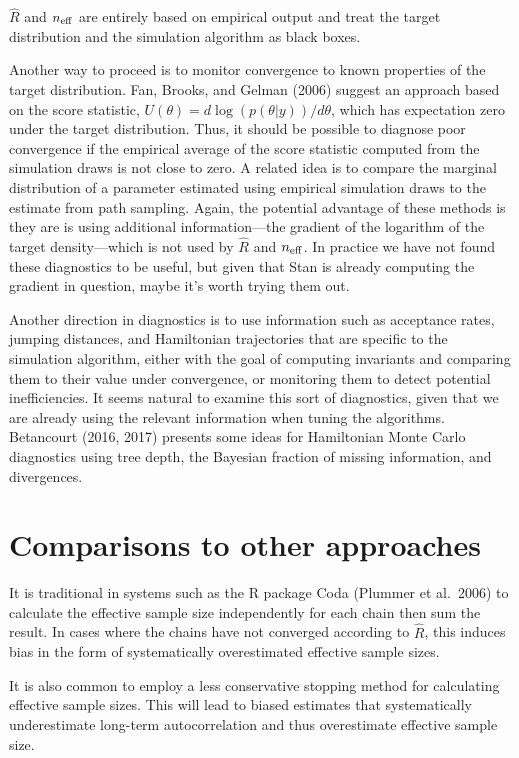 \documentclass[11pt]{article}
\begin{document}
$\widehat{R}$ and $n_{\rm eff}$ are entirely based on empirical output and treat the target distribution and the simulation algorithm as black boxes.

Another way to proceed is to monitor convergence to known properties of the target distribution.  Fan, Brooks, and Gelman (2006) suggest an approach based on the score statistic, $U(\theta) = d\log(p(\theta|y))/d\theta$, which has expectation zero under the target distribution.  Thus, it should be possible to diagnose poor convergence if the empirical average of the score statistic computed from the simulation draws is not close to zero.  A related idea is to compare the marginal distribution of a parameter estimated using empirical simulation draws to the estimate from path sampling.  Again, the potential advantage of these methods is they are is using additional information---the gradient of the logarithm of the target density---which is not used by $\widehat{R}$ and $n_{\rm eff}$.  In practice we have not found these diagnostics to be useful, but given that Stan is already computing the gradient in question, maybe it's worth trying them out.

Another direction in diagnostics is to use information such as acceptance rates, jumping distances, and Hamiltonian trajectories that are specific to the simulation algorithm, either with the goal of computing invariants and comparing them to their value under convergence, or monitoring them to detect potential inefficiencies.  It seems natural to examine this sort of diagnostics, given that we are already using the relevant information when tuning the algorithms.  Betancourt (2016, 2017) presents some ideas for Hamiltonian Monte Carlo diagnostics using tree depth, the Bayesian fraction of missing information, and divergences.

\section{Comparisons to other approaches}

It is traditional in systems such as the R package Coda (Plummer et al.~2006) to calculate the effective sample size independently for each chain then sum the result.  In cases where the chains have not converged according to $\widehat{R}$, this induces bias in the form of systematically overestimated effective sample sizes.

It is also common to employ a less conservative stopping method for calculating effective sample sizes.  This will lead to biased estimates that systematically underestimate long-term autocorrelation and thus overestimate effective sample size.
\end{document}
